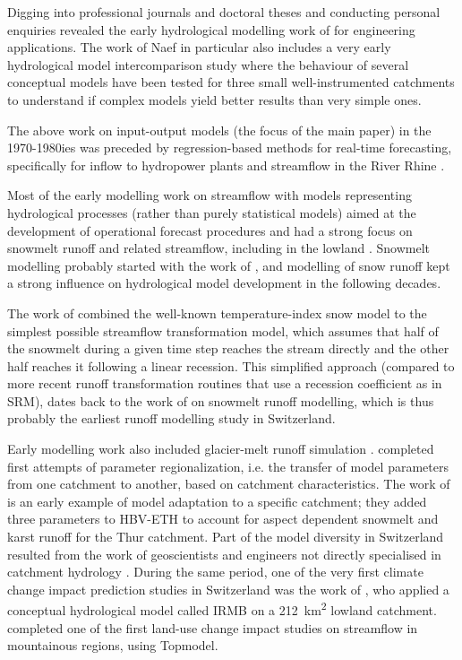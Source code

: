 \documentclass[10pt,a4paper]{article}
\begin{document}
Digging into professional journals and doctoral theses and conducting personal enquiries revealed the early hydrological modelling work of \citet{naef1974} for engineering applications. The work of Naef in particular also includes a very early hydrological model intercomparison study \citep{naef1977} where the behaviour of several conceptual models have been tested for three small well-instrumented catchments to understand if complex models yield better results than very simple ones.

The above work on input-output models (the focus of the main paper) in the 1970-1980ies was preceded by regression-based methods for real-time forecasting, specifically for inflow to hydropower plants \citep{jensenlang1973} and streamflow in the River Rhine \citep[e.g. to predict downstream summer droughts,][]{lugiez1969}.

Most of the early modelling work on streamflow with models representing hydrological processes (rather than purely statistical models) aimed at the development of operational forecast procedures and had a strong focus on snowmelt runoff and related streamflow, including in the lowland \citep{braun1986}. Snowmelt modelling probably started with the work of \citet{hoeck1952}, and modelling of snow runoff kept a strong influence on hydrological model development in the following decades.

The work of \citet{braun1986} combined the well-known temperature-index snow model \citep[underlying also the SRM model;][]{martinec1975} to the simplest possible streamflow transformation model, which assumes that half of the snowmelt during a given time step reaches the stream directly and the other half reaches it following a linear recession. This simplified approach (compared to more recent runoff transformation routines that use a recession coefficient as in SRM), dates back to the work of \citet{martinec1970} on snowmelt runoff modelling, which is thus probably the earliest runoff modelling study in Switzerland. 

Early modelling work also included glacier-melt runoff simulation \citep[][who used a model called HBV3-ETH, not in use anymore]{braun90}. \citet{braun1992} completed first attempts of parameter regionalization, i.e. the transfer of model parameters from one catchment to another, based on catchment characteristics. The work of \citet{hottelet1993} is an early example of model adaptation to a specific catchment; they added three parameters to HBV-ETH to account for aspect dependent snowmelt and karst runoff for the Thur catchment. Part of the model diversity in Switzerland resulted from the work of geoscientists and engineers not directly specialised in catchment hydrology \citep{Abednego1990, baumgartner1986, hager1984, Sautier1980}.
During the same period, one of the very first climate change impact prediction studies in Switzerland was the work of \citet{bultot1992}, who applied a conceptual hydrological model called IRMB on a 212~km\textsuperscript{2} lowland catchment. \citet{jordan1990} completed one of the first land-use change impact studies on streamflow in mountainous regions, using Topmodel. 
\end{document}
